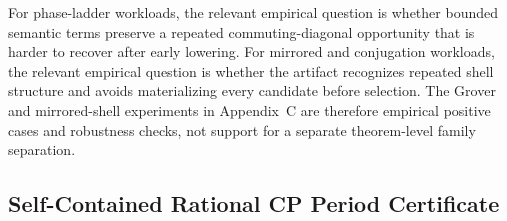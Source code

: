 For phase-ladder workloads, the relevant empirical question is whether bounded
semantic terms preserve a repeated commuting-diagonal opportunity that is
harder to recover after early lowering. For mirrored and conjugation workloads,
the relevant empirical question is whether the artifact recognizes repeated
shell structure and avoids materializing every candidate before selection. The
Grover and mirrored-shell experiments in Appendix~C are therefore empirical
positive cases and robustness checks, not support for a separate theorem-level
family separation.

\subsection{Self-Contained Rational CP Period Certificate}
\label{app:sec:rational-period}

